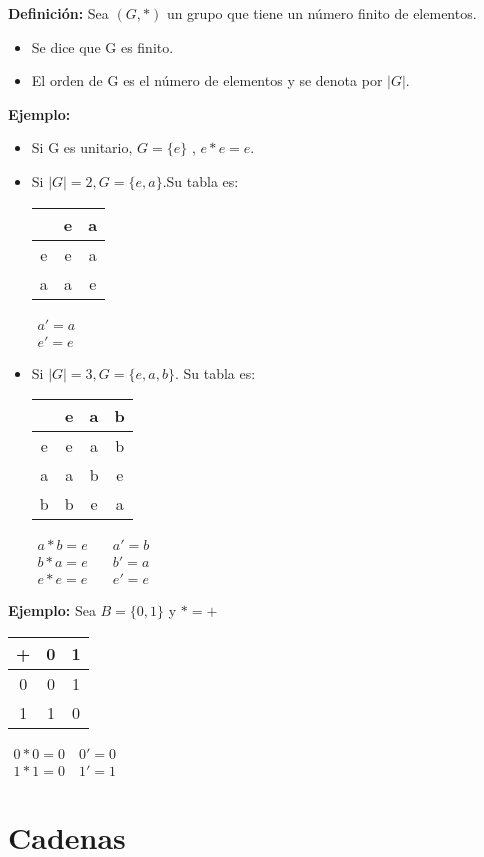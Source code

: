 \textbf{Definición: }Sea $(G,*)$ un grupo que tiene un número finito de elementos.
\begin{itemize}
\item Se dice que G es finito.
\item El orden de G es el número de elementos y se denota por $|G|$.
\end{itemize}


\textbf{Ejemplo: }
\begin{itemize}
\item Si G es unitario, $G=\lbrace e\rbrace$ , $e*e=e$.
\item Si $|G|=2, G=\lbrace e,a\rbrace$.Su tabla es:

\begin{tabular}{c|cc}
 &e&a\\ \hline
e&e&a\\
a&a&e
\end{tabular}
$\begin{matrix}
a'=a \\
e'=e
\end{matrix}$
\item Si $|G|=3, G=\lbrace e,a,b\rbrace$. Su tabla es:\\
\begin{tabular}{c|ccc}
 &e&a&b\\ \hline
e&e&a&b\\
a&a&b&e\\
b&b&e&a
\end{tabular}

$\begin{matrix} a*b=e \quad & a'=b\\
b*a=e \quad & b'=a\\
e*e=e \quad & e'=e\end{matrix}$
\end{itemize}

\textbf{Ejemplo: }Sea $B=\lbrace 0,1\rbrace$ y $*=+$
\begin{center}
\begin{tabular}{c|cc}
+&0&1\\ \hline
0&0&1\\
1&1&0
\end{tabular}

$\begin{matrix}
0*0=0 \quad 0'=0\\
1*1=0 \quad 1'=1
\end{matrix}$
\end{center}

\section{Cadenas}

